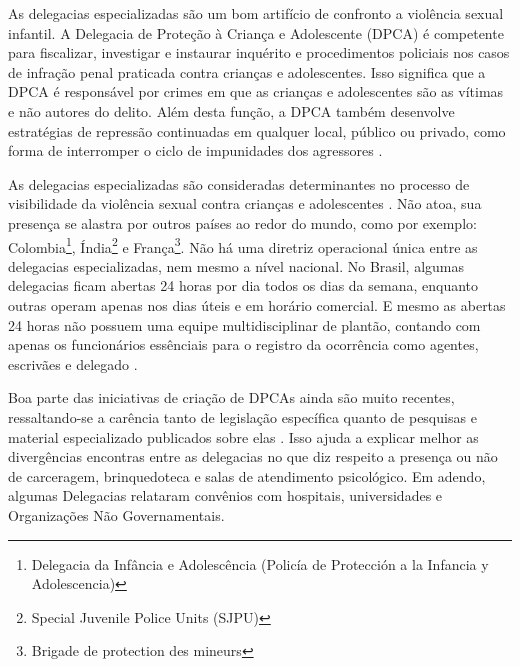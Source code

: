 As delegacias especializadas são um bom artifício de confronto a violência sexual infantil. A Delegacia de Proteção à Criança e Adolescente (DPCA) é competente para fiscalizar, investigar e instaurar inquérito e procedimentos policiais nos casos de infração penal praticada contra crianças e adolescentes. Isso significa que a DPCA é responsável por crimes em que as crianças e adolescentes são as vítimas e não autores do delito. Além desta função, a DPCA também desenvolve estratégias de repressão continuadas em qualquer local, público ou privado, como forma de interromper o ciclo de impunidades dos agressores \cite{rodrigues2014}. %

As delegacias especializadas são consideradas determinantes no processo de visibilidade da violência sexual contra crianças e adolescentes \cite{plano2013}. Não atoa, sua presença se alastra por outros países ao redor do mundo, como por exemplo: Colombia\footnote{Delegacia da Infância e Adolescência (Policía de Protección a la Infancia y Adolescencia)}, Índia\footnote{Special Juvenile Police Units (SJPU)} e França\footnote{Brigade de protection des mineurs}.
Não há uma diretriz operacional única entre as delegacias especializadas, nem mesmo a nível nacional. No Brasil, algumas delegacias ficam abertas 24 horas por dia todos os dias da semana, enquanto outras operam apenas nos dias úteis e em horário comercial. E mesmo as abertas 24 horas não possuem uma equipe multidisciplinar de plantão, contando com apenas os funcionários essênciais para o registro da ocorrência como agentes, escrivães e delegado \cite{novo2016}. 

Boa parte das iniciativas de criação de DPCAs ainda são muito recentes, ressaltando-se a carência tanto de legislação específica quanto de pesquisas e material especializado publicados sobre elas \cite{novo2016}. Isso ajuda a explicar melhor as divergências encontras entre as delegacias no que diz respeito a presença ou não de carceragem, brinquedoteca e salas de atendimento psicológico. 
Em adendo, algumas Delegacias relataram convênios com hospitais, universidades e Organizações Não Governamentais.

